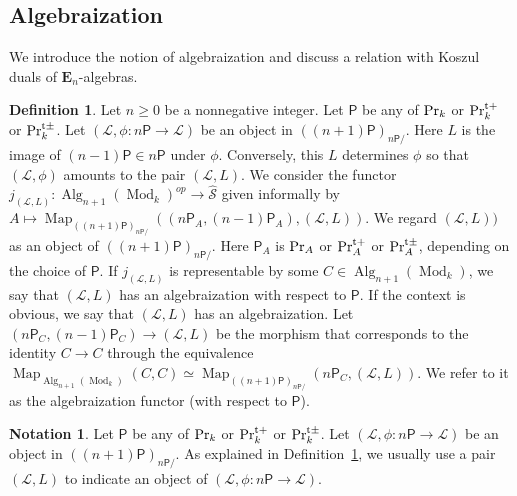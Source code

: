\documentclass[leqno,12pt]{amsart}
\theoremstyle{plain}
\theoremstyle{definition}
\newtheorem{Definition}[Theorem]{Definition}
\newtheorem{Notation}[Theorem]{Notation}
\newcommand{\PR}{\textup{Pr}}
\newcommand{\PRTT}{\textup{Pr}^{\textup{t}+}}
\newcommand{\PRTTT}{\textup{Pr}^{\textup{t}\pm}}
\newcommand{\LLL}{\mathcal{L}}
\newcommand{\Mod}{\operatorname{Mod}}
\newcommand{\wSSS}{\widehat{\mathcal{S}}}
\newcommand{\Map}{\operatorname{Map}}
\newcommand{\Alg}{\operatorname{Alg}}
\newcommand{\eenu}{\mathbf{E}_n}
\begin{document}
\subsection{Algebraization}

We introduce the notion of algebraization and discuss a relation with Koszul duals of $\eenu$-algebras.


\begin{Definition}
\label{plainalgebraizationdef}
Let $n\ge0$ be a nonnegative integer.
Let $\mathsf{P}$ be any of $\PR_k$ or $\PRTT_k$ or $\PRTTT_k$.
Let $(\LLL,\phi:n\mathsf{P}\to \LLL)$ be an object in $((n+1)\mathsf{P})_{n\mathsf{P}/}$.
Here $L$ is the image of $(n-1)\mathsf{P}\in n\mathsf{P}$ under $\phi$.
Conversely, this $L$ determines $\phi$ so that $(\LLL,\phi)$ amounts to the pair $(\LLL,L)$.
We consider the functor $j_{(\LLL,L)}:\Alg_{n+1}(\Mod_k)^{op}\to \wSSS$ given informally by $A\mapsto \Map_{((n+1)\mathsf{P})_{n\mathsf{P}/}}((n\mathsf{P}_A,(n-1)\mathsf{P}_A),(\LLL,L))$. We regard $(\LLL,L))$ as an object of $((n+1)\mathsf{P})_{n\mathsf{P}/}$.
Here $\mathsf{P}_A$ is $\PR_A$ or $\PRTT_A$ or $\PRTTT_A$, depending on the choice of $\mathsf{P}$.
If $j_{(\LLL,L)}$ is representable by some $C\in \Alg_{n+1}(\Mod_k)$, we say that $(\LLL,L)$ has an algebraization with respect to $\mathsf{P}$.
If the context is obvious, we say that $(\LLL,L)$ has an algebraization.
Let $(n\mathsf{P}_C,(n-1)\mathsf{P}_C) \to (\LLL,L)$ be the morphism
that corresponds to the identity $C\to C$ through the equivalence $\Map_{\Alg_{n+1}(\Mod_k)}(C,C)\simeq \Map_{((n+1)\mathsf{P})_{n\mathsf{P}/}}(n\mathsf{P}_C,(\LLL,L))$.
We refer to it as the algebraization functor (with respect to $\mathsf{P}$).
\end{Definition}


\begin{Notation}
Let $\mathsf{P}$ be any of $\PR_k$ or $\PRTT_k$ or $\PRTTT_k$.
Let $(\LLL,\phi:n\mathsf{P}\to \LLL)$ be an object in $((n+1)\mathsf{P})_{n\mathsf{P}/}$.
As explained in Definition~\ref{plainalgebraizationdef}, we usually use
a pair $(\LLL,L)$ to indicate an object of $(\LLL,\phi:n\mathsf{P}\to \LLL)$.
\end{Notation}
\end{document}
